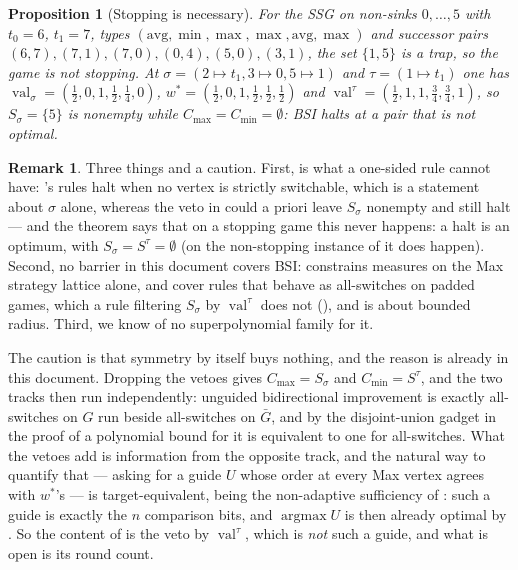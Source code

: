 \documentclass[11pt]{article}
\theoremstyle{plain}
\newtheorem{proposition}[theorem]{Proposition}
\theoremstyle{definition}
\newtheorem{remark}[theorem]{Remark}
\DeclareMathOperator{\val}{val}
\begin{document}
\begin{proposition}[Stopping is necessary]\label{prop:bsi-nonstopping}
For the SSG on non-sinks $0,\dots,5$ with $t_0=6$, $t_1=7$, types
$(\mathrm{avg},\min,\max,\max,\mathrm{avg},\max)$ and successor pairs
$(6,7),(7,1),(7,0),(0,4),(5,0),(3,1)$, the set $\{1,5\}$ is a trap, so the
game is not stopping. At $\sigma=(2\mapsto t_1,3\mapsto0,5\mapsto1)$ and
$\tau=(1\mapsto t_1)$ one has
$\val_\sigma=(\tfrac12,0,1,\tfrac12,\tfrac14,0)$,
$w^\ast=(\tfrac12,0,1,\tfrac12,\tfrac12,\tfrac12)$ and
$\val^\tau=(\tfrac12,1,1,\tfrac34,\tfrac34,1)$, so $S_\sigma=\{5\}$ is
nonempty while $C_{\max}=C_{\min}=\emptyset$: BSI halts at a pair that is
not optimal.
\end{proposition}

\begin{remark}\label{rem:bsi}
Three things and a caution. First,  is what a
one-sided rule cannot have: 's rules halt when no vertex is
strictly switchable, which is a statement about $\sigma$ alone, whereas the
veto in  could a priori leave $S_\sigma$ nonempty and still
halt --- and the theorem says that on a stopping game this never happens:
a halt is an optimum, with $S_\sigma=S^\tau=\emptyset$ (on the
non-stopping instance of  it does happen).
Second, no barrier in this document covers BSI: 
constrains measures on the Max strategy lattice alone,
 and  cover rules
that behave as all-switches on padded games, which a rule filtering
$S_\sigma$ by $\val^\tau$ does not (), and
 is about bounded radius. Third, we know of no
superpolynomial family for it.

The caution is that symmetry by itself buys nothing, and the reason is
already in this document. Dropping the vetoes gives
$C_{\max}=S_\sigma$ and $C_{\min}=S^\tau$, and the two tracks then run
independently: unguided bidirectional improvement is exactly all-switches
on $G$ run beside all-switches on $\bar G$, and by the disjoint-union
gadget in the proof of  a polynomial bound
for it is equivalent to one for all-switches. What the vetoes add is
information from the opposite track, and the natural way to quantify that
--- asking for a guide $U$ whose order at every Max vertex agrees with
$w^\ast$'s --- is target-equivalent, being the non-adaptive sufficiency of
: such a guide is exactly the $n$ comparison
bits, and $\operatorname{argmax}U$ is then already optimal by
. So the content of  is the veto by
$\val^\tau$, which is \emph{not} such a guide, and what is open is its
round count.
\end{remark}
\end{document}
